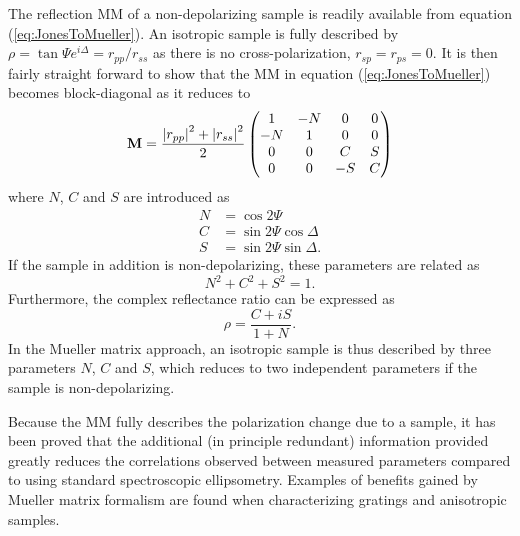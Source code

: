 The reflection MM of a non-depolarizing sample is readily available from equation (\ref{eq:JonesToMueller}). An isotropic sample is fully described by $\rho = \tan\Psi e^{i\Delta} = r_{pp}/r_{ss}$ as there is no cross-polarization, $r_{sp} = r_{ps} = 0$. It is then fairly straight forward to show that the MM in equation (\ref{eq:JonesToMueller}) becomes block-diagonal as it reduces to
\begin{equation}
    \mathbf{M} = \frac{\left| r_{pp} \right|^2+\left| r_{ss} \right|^2}{2}
    \begin{pmatrix}
    1 & -N & 0 & 0 \\
    -N & 1 & 0 & 0 \\
    0 & 0 & C & S \\
    0 & 0 & -S & C 
    \end{pmatrix}
    \label{eq:isotropicMM}
\end{equation}
where $N$, $C$ and $S$ are introduced as 
\begin{subequations}
\begin{align}
    N &= \cos 2\Psi                 \\
    C &= \sin 2\Psi \cos \Delta     \\
    S &= \sin 2\Psi \sin \Delta.
\end{align}
    \label{eq:NCS}
\end{subequations}
If the sample in addition is non-depolarizing, these parameters are related as 
\begin{equation}
    N^2+C^2+S^2=1.
    \label{eq:sumNCSsquared=1}
\end{equation}
Furthermore, the complex reflectance ratio can be expressed as \cite{hans_arwin}
\begin{equation}
    \rho = \frac{C+iS}{1+N}.
\end{equation}
In the Mueller matrix approach, an isotropic sample is thus described by three parameters $N$, $C$ and $S$, which reduces to two independent parameters if the sample is non-depolarizing.

Because the MM fully describes the polarization change due to a sample, it has been proved that the additional (in principle redundant) information provided greatly reduces the correlations observed between measured parameters compared to using standard spectroscopic ellipsometry. Examples of benefits gained by Mueller matrix formalism are found when characterizing gratings and anisotropic samples\cite{DeMartino_MMgratingscharacterization}.

 
